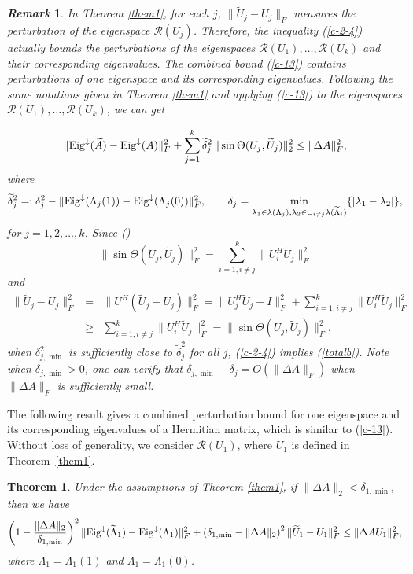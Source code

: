 \documentclass[11pt,a4paper]{article}
\numberwithin{equation}{section}
\newtheorem{Theorem}{Theorem}[section]
\newtheorem{Remark}{{\it Remark}}[section]
\newcommand {\wt} {\widetilde}
\begin{document}
\begin{Remark}\label{rem23}
In Theorem \ref{them1}, for each $j$, $\|\wt U_j-U_j\|_F$ measures the perturbation of the eigenspace $\mathcal R(U_j)$. Therefore,
the inequality (\ref{c-2-4}) actually bounds the perturbations of the eigenspaces $\mathcal R(U_1),\ldots,\mathcal R(U_k)$ and their corresponding eigenvalues.
The combined bound (\ref{c-13}) contains  perturbations of one eigenspace  and its corresponding eigenvalues.  Following the same notations given in Theorem \ref{them1} and applying (\ref{c-13}) to the eigenspaces $\mathcal{R}(U_1),\ldots,\mathcal{R}(U_k)$, we can get

\begin{eqnarray} \label{totalb}
\|{\rm Eig}^{\downarrow}(\wt A)-{\rm Eig}^{\downarrow}(A)\|_F^2
+\sum_{j=1}^k{\wt\delta}^2_{j}\,\|\sin\Theta(U_j,\wt U_j)\|_2^2
\le \|\Delta A\|_F^2,
\end{eqnarray}
where
\[
\wt \delta_{j}^2=:\delta_{j}^2-\|{\rm Eig}^{\downarrow}(\Lambda_j(1))-{\rm Eig}^{\downarrow}(\Lambda_j(0))\|_F^2,\qquad
\delta_{j}=\min_{\lambda_1\in\lambda(\Lambda_j)
, \lambda_2\in\cup_{i\ne j}\lambda(\wt\Lambda_i)}\{|\lambda_1-\lambda_2|\},
\]
for $j=1,2,\ldots,k$.
Since (\cite[Chapter I, Theorem 5.5]{ss90})
\[\|\sin\Theta(U_j,\wt U_j)\|_F^2=\sum_{i=1,i\ne j}^k\|U_i^H\wt U_j\|_F^2
\]
and
\begin{eqnarray}
\label{esin}
\|\wt U_j-U_j\|_F^2&=&\|U^H(\wt U_j-U_j)\|_F^2
=\|U_j^H\wt U_j-I\|_F^2+\sum_{i=1,i\ne j}^k\|U_i^H\wt U_j\|_F^2 \nonumber\\
&\ge&\sum_{i=1,i\ne j}^k\|U_i^H\wt U_j\|_F^2=\|\sin\Theta(U_j,\wt U_j)\|_F^2,
\end{eqnarray}
when $\delta_{j,\min}^2$ is sufficiently close to  $\wt \delta_{j}^2$ for all $j$,
(\ref{c-2-4}) implies (\ref{totalb}). Note when $\delta_{j,\min}>0$, one can verify that
$\delta_{j,\min}-\wt\delta _j=O(\|\Delta A\|_F)$ when $\|\Delta A\|_F$ is sufficiently small.
\end{Remark}

\medskip

The following result gives a combined perturbation bound for one eigenspace and its corresponding  eigenvalues of a Hermitian matrix, which is similar to (\ref{c-13}). Without loss of generality, we consider
$\mathcal R(U_1)$, where $U_1$ is defined in Theorem~\ref{them1}.

\medskip
\begin{Theorem}\label{them2}
Under the assumptions of Theorem \ref{them1}, if $\|\Delta A\|_2<\delta_{1,\min}$,  then we have
{\footnotesize\begin{eqnarray}\label{c-2-15}
\left(1-\frac{\|{\Delta A}\|_2}{\delta_{1,\min}}\right)^2\|{\rm Eig}^{\downarrow}(\wt \Lambda_1)-{\rm Eig}^{\downarrow}(\Lambda_1)\|_F^2+\left(\delta_{1,\min}-\|{\Delta A}\|_2\right)^2\|\wt U_1-U_1\|_F^2\leq \|\Delta AU_1\|_F^2,
\end{eqnarray}}
where $\wt \Lambda_1=\Lambda_1(1)$ and $\Lambda_1=\Lambda_1(0)$.
\end{Theorem}
\end{document}
